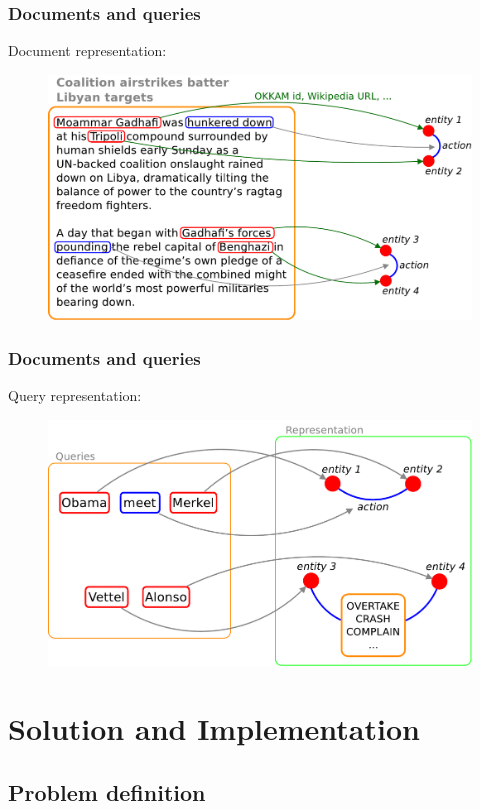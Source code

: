 \documentclass{beamer}
\begin{document}
\begin{frame}
\frametitle{Documents and queries}
Document representation:\\
\begin{figure}
\includegraphics[scale=0.37]{imgs/docsrep}
\end{figure}
\end{frame}

\begin{frame}
\frametitle{Documents and queries}
Query representation:\\
\begin{figure}
\includegraphics[scale=0.37]{imgs/qryrep}
\end{figure}
\bigskip
\end{frame}

\section{Solution and Implementation}
\subsection{Problem definition}
\end{document}
